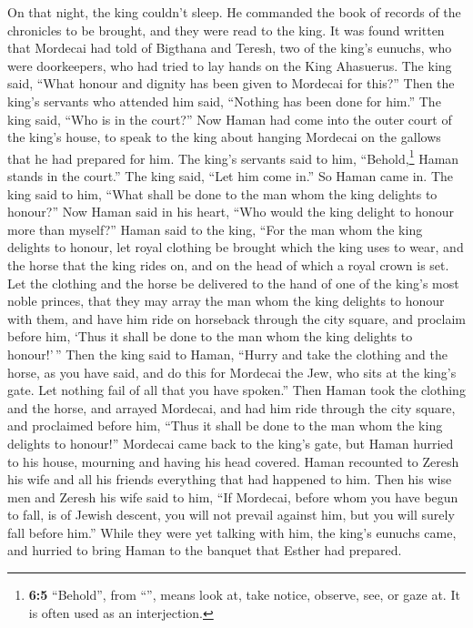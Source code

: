  On that night, the king couldn't sleep. He commanded the
book of records of the chronicles to be brought, and they were read to
the king.  It was found written that Mordecai had told of
Bigthana and Teresh, two of the king's eunuchs, who were doorkeepers,
who had tried to lay hands on the King Ahasuerus.  The
king said, ``What honour and dignity has been given to Mordecai for
this?'' Then the king's servants who attended him said, ``Nothing has
been done for him.''  The king said, ``Who is in the
court?'' Now Haman had come into the outer court of the king's house, to
speak to the king about hanging Mordecai on the gallows that he had
prepared for him.  The king's servants said to him,
``Behold,\footnote{\textbf{6:5} ``Behold'', from ``'', means
  look at, take notice, observe, see, or gaze at. It is often used as an
  interjection.} Haman stands in the court.'' The king said, ``Let him
come in.''  So Haman came in. The king said to him, ``What
shall be done to the man whom the king delights to honour?'' Now Haman
said in his heart, ``Who would the king delight to honour more than
myself?''  Haman said to the king, ``For the man whom the
king delights to honour,  let royal clothing be brought
which the king uses to wear, and the horse that the king rides on, and
on the head of which a royal crown is set.  Let the
clothing and the horse be delivered to the hand of one of the king's
most noble princes, that they may array the man whom the king delights
to honour with them, and have him ride on horseback through the city
square, and proclaim before him, `Thus it shall be done to the man whom
the king delights to honour!'\,''  Then the king said to
Haman, ``Hurry and take the clothing and the horse, as you have said,
and do this for Mordecai the Jew, who sits at the king's gate. Let
nothing fail of all that you have spoken.''  Then Haman
took the clothing and the horse, and arrayed Mordecai, and had him ride
through the city square, and proclaimed before him, ``Thus it shall be
done to the man whom the king delights to honour!'' 
Mordecai came back to the king's gate, but Haman hurried to his house,
mourning and having his head covered.  Haman recounted to
Zeresh his wife and all his friends everything that had happened to him.
Then his wise men and Zeresh his wife said to him, ``If Mordecai, before
whom you have begun to fall, is of Jewish descent, you will not prevail
against him, but you will surely fall before him.'' 
While they were yet talking with him, the king's eunuchs came, and
hurried to bring Haman to the banquet that Esther had prepared.

